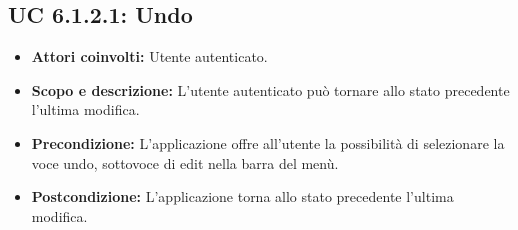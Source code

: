 \subsection{UC 6.1.2.1: Undo}
\begin{itemize}
		\item \textbf{Attori coinvolti:} Utente autenticato. \\
		\item \textbf{Scopo e descrizione:} L'utente autenticato può tornare allo stato precedente l'ultima modifica. \\
		\item \textbf{Precondizione:} L'applicazione offre all'utente la possibilità di selezionare la voce undo, sottovoce di edit nella barra del menù. \\
		\item \textbf{Postcondizione:} L'applicazione torna allo stato precedente l'ultima modifica. \\
\end{itemize}